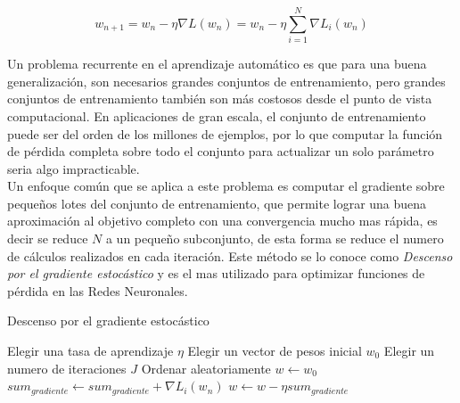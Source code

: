 \documentclass[a4paper,11pt,spanish]{book}
\begin{document}
      \begin{equation}
	w_{n+1} = w_n - \eta \nabla L(w_n)  = w_n - \eta \sum_{i=1}^{N} \nabla L_i(w_n)
      \end{equation}

      Un problema recurrente en el aprendizaje automático es que para una buena generalización, son necesarios grandes conjuntos de entrenamiento,
      pero grandes conjuntos de entrenamiento también son más costosos desde el punto de vista computacional.
      En aplicaciones de gran escala, el conjunto de entrenamiento puede ser del orden de los millones de ejemplos, por lo que computar la función de
      pérdida completa sobre todo el conjunto para actualizar un solo parámetro seria algo impracticable.\\
      Un enfoque común que se aplica a este problema es computar el gradiente sobre pequeños lotes del conjunto de entrenamiento,
      que permite lograr una buena aproximación al objetivo completo con una convergencia mucho mas rápida, es decir se reduce $N$ a un pequeño subconjunto, de esta forma se
      reduce el numero de cálculos realizados en cada iteración. Este método se lo conoce como \emph{Descenso por el gradiente estocástico} y es el mas utilizado para optimizar
      funciones de pérdida en las Redes Neuronales.

	\begin{algorithm}[H]
	  \caption{Descenso por el gradiente estocástico}
	  \label{SGD}
	  \begin{algorithmic}
	    \State Elegir una tasa de aprendizaje $\eta$
	    \State Elegir un vector de pesos inicial $w_0$
	    \State Elegir un numero de iteraciones $J$
	    \State Ordenar aleatoriamente
	    \State $w \gets w_0$
		$sum_{gradiente} \gets sum_{gradiente} + \nabla L_i(w_n)$
	      \EndFor
	      \State $w \gets w - \eta sum_{gradiente}$
	    \EndFor
	  \end{algorithmic}
	\end{algorithm}
\end{document}
